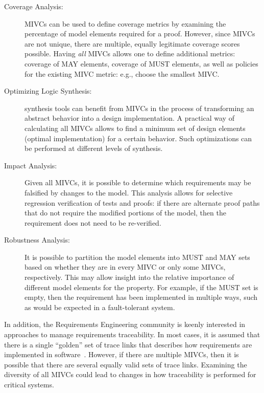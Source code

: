 \begin{description}
    \item [Coverage Analysis:] MIVCs can be used to define coverage metrics by examining the percentage of model elements required for a proof.  However, since MIVCs are not unique, there are multiple, equally legitimate coverage scores possible.  Having \emph{all} MIVCs allows one to define additional metrics: coverage of MAY elements, coverage of MUST elements, as well as policies for the existing MIVC metric: e.g., choose the smallest MIVC.
    \item [Optimizing Logic Synthesis:]  synthesis tools can benefit from MIVCs in the process of transforming an abstract behavior into a design implementation. A practical way of calculating all MIVCs allows to find a minimum set of design elements (optimal implementation) for a certain behavior. Such optimizations can be performed at different levels of synthesis.
    \item [Impact Analysis:] Given all MIVCs, it is possible to determine which requirements may be falsified by changes to the model.  This analysis allows for selective regression verification of tests and proofs: if there are alternate proof paths that do not require the modified portions of the model, then the requirement does not need to be re-verified.
    \item [Robustness Analysis:] It is possible to partition the model elements into MUST and MAY sets based on whether they are in every MIVC or only some MIVCs, respectively.  This may allow insight into the relative importance of different model elements for the property.  For example, if the MUST set is empty, then the requirement has been implemented in multiple ways, such as would be expected in a fault-tolerant system.
\end{description}

\noindent In addition, the Requirements Engineering community is keenly interested in approaches to manage requirements traceability.  In most cases, it is assumed that there is a single ``golden'' set of trace links that describes how requirements are implemented in software~\cite{COEST,hayes2003improving,cleland2007best}. However, if there are multiple MIVCs, then it is possible that there are several equally valid sets of trace links.  Examining the diversity of all MIVCs could lead to changes in how traceability is performed for critical systems.

